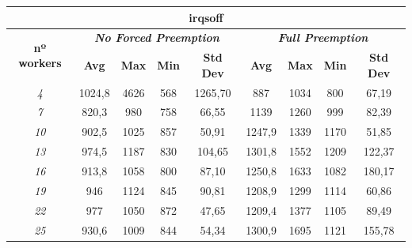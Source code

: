 \documentclass[../main.tex]{subfiles}
\begin{document}
\begin{table}[htp]
\begin{tabular}{|c|c|c|c|c|c|c|c|c|}
\hline
\multicolumn{9}{|c|}{\textbf{irqsoff}}                                                                                                                               \\ \hline
\multirow{2}{*}{\textbf{nº workers}} & \multicolumn{4}{c|}{\textit{\textbf{No Forced Preemption}}}   & \multicolumn{4}{c|}{\textit{\textbf{Full Preemption}}}        \\ \cline{2-9} 
                                     & \textbf{Avg} & \textbf{Max} & \textbf{Min} & \textbf{Std Dev} & \textbf{Avg} & \textbf{Max} & \textbf{Min} & \textbf{Std Dev} \\ \hline
\textit{4}                           & 1024,8       & 4626         & 568          & 1265,70          & 887          & 1034         & 800          & 67,19            \\ \hline
\textit{7}                           & 820,3        & 980          & 758          & 66,55            & 1139         & 1260         & 999          & 82,39            \\ \hline
\textit{10}                          & 902,5        & 1025         & 857          & 50,91            & 1247,9       & 1339         & 1170         & 51,85            \\ \hline
\textit{13}                          & 974,5        & 1187         & 830          & 104,65           & 1301,8       & 1552         & 1209         & 122,37           \\ \hline
\textit{16}                          & 913,8        & 1058         & 800          & 87,10            & 1250,8       & 1633         & 1082         & 180,17           \\ \hline
\textit{19}                          & 946          & 1124         & 845          & 90,81            & 1208,9       & 1299         & 1114         & 60,86            \\ \hline
\textit{22}                          & 977          & 1050         & 872          & 47,65            & 1209,4       & 1377         & 1105         & 89,49            \\ \hline
\textit{25}                          & 930,6        & 1009         & 844          & 54,34            & 1300,9       & 1695         & 1121         & 155,78           \\ \hline

\end{tabular}
\end{table}
\end{document}
